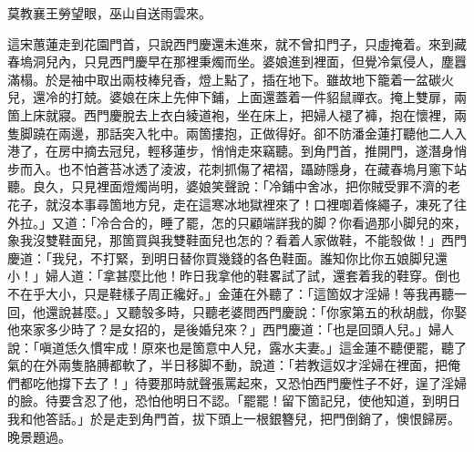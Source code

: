 \begin{myquote} 
莫教襄王勞望眼，巫山自送雨雲來。
\end{myquote} 

這宋蕙蓮走到花園門首，只說西門慶還未進來，{}就不曾扣門子，只虛掩着。來到藏春塢洞兒內，只見西門慶早在那裡秉燭而坐。婆娘進到裡面，但覺冷氣侵人，塵囂滿榻。於是袖中取出兩枝棒兒香，燈上點了，插在地下。雖故地下籠着一盆碳火兒，還冷的打兢。婆娘在床上先伸下鋪，上面還蓋着一件貂鼠禪衣。掩上雙扉，兩箇上床就寢。西門慶脫去上衣白綾道袍，坐在床上，把婦人褪了褲，抱在懷裡，兩隻脚蹺在兩邊，那話突入牝中。兩箇摟抱，正做得好。卻不防潘金蓮打聽他二人入港了，在房中摘去冠兒，輕移蓮步，悄悄走來竊聽。到角門首，推開門，遂潛身悄步而入。也不怕蒼苔冰透了淩波，花刺抓傷了裙褶，躡跡隱身，在藏春塢月窻下站聽。{}良久，只見裡面燈燭尚明，婆娘笑聲說：「冷鋪中舍冰，把你賊受罪不濟的老花子，{}就沒本事尋箇地方兒，走在這寒冰地獄裡來了！口裡啣着條繩子，凍死了往外拉。」又道：「冷合合的，睡了罷，怎的只顧端詳我的脚？你看過那小脚兒的來，象我沒雙鞋面兒，那箇買與我雙鞋面兒也怎的？{}看着人家做鞋，不能彀做！」西門慶道：「我兒，不打緊，到明日替你買幾錢的各色鞋面。誰知你比你五娘脚兒還小！」{}婦人道：「拿甚麼比他！昨日我拿他的鞋畧試了試，還套着我的鞋穿。倒也不在乎大小，只是鞋樣子周正纔好。」{}金蓮在外聽了：「這箇奴才淫婦！等我再聽一回，他還說甚麼。」又聽彀多時，只聽老婆問西門慶說：「你家第五的秋胡戲，你娶他來家多少時了？是女招的，是後婚兒來？」西門慶道：「也是回頭人兒。」婦人說：「嗔道恁久慣牢成！原來也是箇意中人兒，露水夫妻。」這金蓮不聽便罷，聽了氣的在外兩隻胳膊都軟了，半日移脚不動，{}說道：「若教這奴才淫婦在裡面，把俺們都吃他撐下去了！」待要那時就聲張罵起來，又恐怕西門慶性子不好，逞了淫婦的臉。待要含忍了他，恐怕他明日不認。「罷罷！留下箇記兒，使他知道，到明日我和他答話。」於是走到角門首，拔下頭上一根銀簪兒，把門倒銷了，懊恨歸房。晚景題過。

